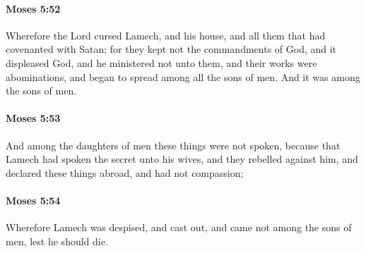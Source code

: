 		\paragraph{Moses 5:52} %
			\label{MOSES-5-52}

			Wherefore the Lord cursed Lamech, and his house, and all them that had covenanted with Satan; for they kept not the commandments of God, and it displeased God, and he ministered not unto them, and their works were abominations, and began to spread among all the sons of men. And it was among the sons of men.


		\paragraph{Moses 5:53} %
			\label{MOSES-5-53}

			And among the daughters of men these things were not spoken, because that Lamech had spoken the secret unto his wives, and they rebelled against him, and declared these things abroad, and had not compassion;


		\paragraph{Moses 5:54} %
			\label{MOSES-5-54}

			Wherefore Lamech was despised, and cast out, and came not among the sons of men, lest he should die.


